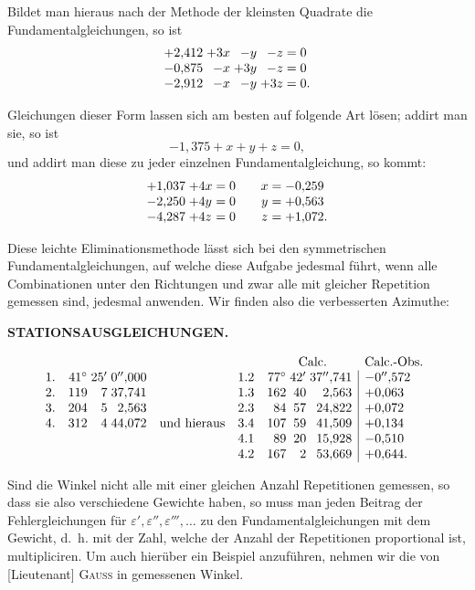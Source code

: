 Bildet man hieraus nach der Methode der kleinsten Quadrate die Fundamentalgleichungen, so ist
\[
\begin{array}{@{}r@{\;}r@{\;}r@{\;}r@{\;=\;}l@{}}
 +2{,}412&+3x&-y&-z&0\\
 -0{,}875&-x&+3y&-z&0\\
 -2{,}912&-x&-y&+3z&0.
\end{array}
\]

Gleichungen dieser Form lassen sich am besten auf folgende Art lösen; addirt man sie, so ist
\[
 -1{,}375+x+y+z=0,
\]
und addirt man diese zu jeder einzelnen Fundamentalgleichung, so kommt:
\[
\begin{array}{@{}r@{\;}l@{\;=\;}r@{\qquad}c@{\;=\;}l@{}}
 +1{,}037&+4x&0&x&-0{,}259\\
 -2{,}250&+4y&0&y&+0{,}563\\
 -4{,}287&+4z&0&z&+1{,}072.
\end{array}
\]

Diese leichte Eliminationsmethode lässt sich bei den symmetrischen Fundamentalgleichungen, auf welche diese Aufgabe jedesmal führt, wenn alle Combinationen unter den Richtungen und zwar alle mit gleicher Repetition gemessen sind, jedesmal anwenden. Wir finden also die verbesserten Azimuthe:

\par\clearpage
\noindent\null\hfill{\small\textbf{STATIONSAUSGLEICHUNGEN.}}\hfill{}\par\medskip

\[
\begin{array}{@{}l@{\quad}r@{\;}r@{\;}r@{\quad}l@{\quad}r@{\quad}r@{\;}r@{\;}r|l@{}}
 \multicolumn{6}{c}{}&\multicolumn{3}{c}{\text{Calc.}}&\multicolumn{1}{c}{\text{Calc.-Obs.}}\\
 1.&41^\circ&25'&0''{,}000&&1.2&77^\circ&42'&37''{,}741&-0''{,}572\\
 2.&119&7&37{,}741&&1.3&162&40&2{,}563&+0{,}063\\
 3.&204&5&2{,}563&&2.3&84&57&24{,}822&+0{,}072\\
 4.&312&4&44{,}072&\text{und hieraus}&3.4&107&59&41{,}509&+0{,}134\\
 &&&&&4.1&89&20&15{,}928&-0{,}510\\
 &&&&&4.2&167&2&53{,}669&+0{,}644.
\end{array}
\]

Sind die Winkel nicht alle mit einer gleichen Anzahl Repetitionen gemessen, so dass sie also verschiedene Gewichte haben, so muss man jeden Beitrag der Fehlergleichungen für \(\varepsilon',\varepsilon'',\varepsilon''',\ldots\) zu den Fundamentalgleichungen mit dem Gewicht, d.~h. mit der Zahl, welche der Anzahl der Repetitionen proportional ist, multipliciren. Um auch hierüber ein Beispiel anzuführen, nehmen wir die von [Lieutenant] \textsc{Gauss} in  gemessenen Winkel.

